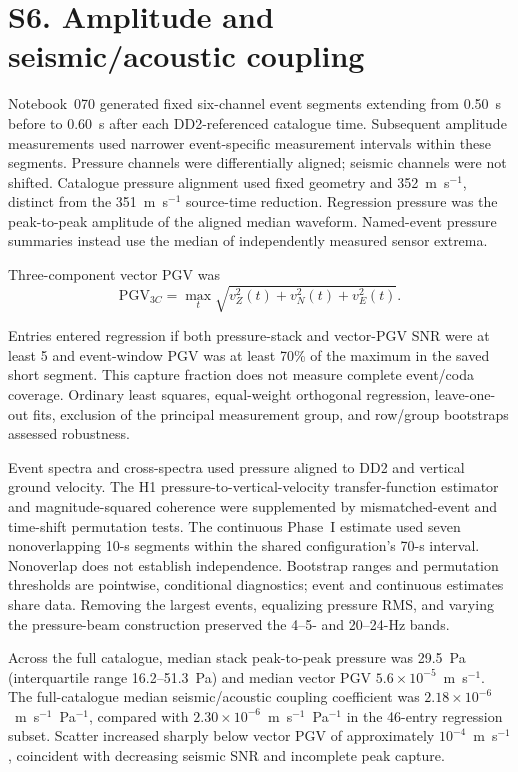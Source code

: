 \documentclass[]{seismica}
\begin{document}
\FloatBarrier

\FloatBarrier


\section*{S6. Amplitude and seismic/acoustic coupling}
\label{sec:supp_coupling}

Notebook~070 generated fixed six-channel event segments extending from 0.50~s
before to 0.60~s after each DD2-referenced catalogue time. Subsequent amplitude
measurements used narrower event-specific measurement intervals within these
segments. Pressure channels were differentially aligned; seismic channels were
not shifted. Catalogue pressure alignment used fixed geometry and
352~m~s$^{-1}$, distinct from the 351~m~s$^{-1}$ source-time reduction.
Regression pressure was the peak-to-peak amplitude of the aligned median
waveform. Named-event pressure summaries instead use the median of independently
measured sensor extrema.

Three-component vector PGV was
\begin{equation}
 \mathrm{PGV}_{3C}=\max_t\sqrt{v_Z^2(t)+v_N^2(t)+v_E^2(t)}.
\end{equation}

Entries entered regression if both pressure-stack and vector-PGV SNR were at
least 5 and event-window PGV was at least 70\% of the maximum in the saved
short segment. This capture fraction does not measure complete event/coda
coverage. Ordinary least squares, equal-weight orthogonal regression,
leave-one-out fits, exclusion of the principal measurement group, and
row/group bootstraps assessed robustness.

Event spectra and cross-spectra used pressure aligned to DD2 and vertical
ground velocity. The H1 pressure-to-vertical-velocity transfer-function
estimator and magnitude-squared coherence were supplemented by
mismatched-event and time-shift permutation tests. The continuous Phase~I
estimate used seven nonoverlapping 10-s segments within the shared
configuration's 70-s interval. Nonoverlap does not establish independence.
Bootstrap ranges and permutation thresholds are pointwise, conditional
diagnostics; event and continuous estimates share data. Removing the largest
events, equalizing pressure RMS, and varying the pressure-beam construction
preserved the 4--5- and 20--24-Hz bands.

Across the full catalogue, median stack peak-to-peak pressure was 29.5~Pa
(interquartile range 16.2--51.3~Pa) and median vector PGV
$5.6\times10^{-5}$~m~s$^{-1}$. The full-catalogue median seismic/acoustic
coupling coefficient was $2.18\times10^{-6}$~m~s$^{-1}$~Pa$^{-1}$,
compared with $2.30\times10^{-6}$~m~s$^{-1}$~Pa$^{-1}$ in the
46-entry regression subset. Scatter increased sharply below vector PGV of
approximately $10^{-4}$~m~s$^{-1}$, coincident with decreasing seismic SNR
and incomplete peak capture.
\end{document}
